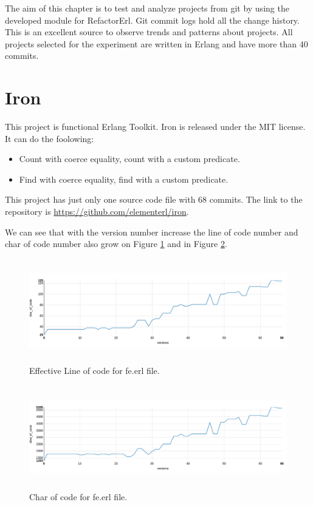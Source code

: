 The aim of this chapter is to test and analyze projects from git by using the developed module for RefactorErl. Git commit logs hold all the change history. This is an excellent source to observe trends and patterns about projects. All projects selected for the experiment are written in Erlang and have more than 40 commits.

\section{Iron}

This project is functional Erlang Toolkit. Iron is released under the MIT license. It can do the foolowing:
\begin{itemize}
	\item Count with coerce equality, count with a custom predicate.
	\item Find with coerce equality, find with a custom predicate.
\end{itemize}

This project has just only one source code file with 68 commits. The link to the repository is \url{https://github.com/elementerl/iron}.

We can see that with the version number increase the line of code number and char of code number also grow on Figure \ref{fig:loc_iron} and in Figure \ref{fig:char_iron}.

\begin{figure}[h]
	\centering
	\includegraphics[height=45mm]{figures/loc_iron.png}
	\caption{Effective Line of code for fe.erl file.}
	\label{fig:loc_iron}
\end{figure}

\begin{figure}[h]
	\centering
	\includegraphics[height=45mm]{figures/char_iron.png}
	\caption{Char of code for fe.erl file.}
	\label{fig:char_iron}
\end{figure}

